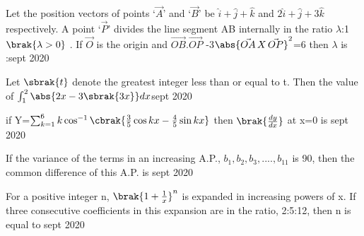\iffalse
  \title{Assignment}
  \author{EE24BTECH11038}
  \section{integer}
\fi  
\item Let the position vectors of points `$\vec{A}$' and `$\vec{B}$' be $\hat{i} +\hat{j}+\hat{k}$ and $2\hat{i} +\hat{j}+3\hat{k}$ respectively. A point `$\vec{P}$' divides the line segment AB internally in the ratio $\lambda$:1 $\brak{\lambda > 0}$ . If $\vec{O}$ is the origin and $\vec{OB}$.$\vec{OP}$ -3$\abs{\vec{OA}\,X\,\vec{OP}}^2$=6 then $\lambda$ is :\hfill{sept 2020}
   \item Let $\sbrak{t}$ denote the greatest integer less than or equal to t. Then the value of
   $\int_{1}^{2}\abs{2x-3\sbrak{3x}}dx$\hfill{sept 2020}
   \item if Y=$\sum_{k=1}^{6} k\cos^{-1}\cbrak{\frac{3}{5}\cos kx-\frac{4}{5}\sin kx}$ then $\brak{\frac{dy}{dx}}$ at x=0 is \hfill{sept 2020}
   \item If the variance of the terms in an increasing A.P., $b_1, b_2, b_3,...., b_{11}$ is 90, then the common difference of this A.P. is \hfill{sept 2020}
   \item For a positive integer n, $\brak{1+\frac{1}{x}}^n$ is expanded in increasing powers of x. If three consecutive coefficients in this expansion are in the ratio, 2:5:12, then n is equal to \hfill{sept 2020}

